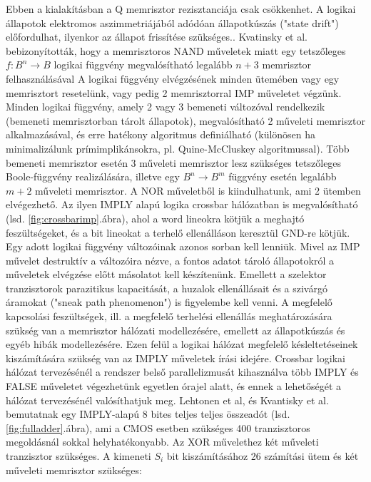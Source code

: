 \documentclass[twoside]{article}
\newcommand\abra[1]{\ref{#1}.ábra}
\begin{document}
Ebben a kialakításban a Q memrisztor rezisztanciája csak csökkenhet. A logikai állapotok elektromos aszimmetriájából adódóan állapotkúszás ("state drift") előfordulhat, ilyenkor az állapot frissítése szükséges.\cite{kvatinsky2011}. Kvatinsky et al. bebizonyították, hogy a memrisztoros NAND műveletek miatt egy tetszőleges $f: B^n \longrightarrow B$ logikai függvény megvalósítható legalább $n+3$ memrisztor felhasználásával\cite{kvatinsky2014} A logikai függvény elvégzésének minden ütemében vagy egy memrisztort resetelünk, vagy pedig 2 memrisztorral IMP műveletet végzünk. Minden logikai függvény, amely 2 vagy 3 bemeneti változóval rendelkezik (bemeneti memrisztorban tárolt állapotok), megvalósítható 2 műveleti memrisztor alkalmazásával\cite{lehtonen2010}, és erre hatékony algoritmus definiálható (különösen ha minimalizálunk prímimplikánsokra, pl. Quine-McCluskey algoritmussal). Több bemeneti memrisztor esetén 3 műveleti memrisztor lesz szükséges tetszőleges Boole-függvény realizálására\cite{lehtonen2009}, illetve egy $B^n \longrightarrow B^m$ függvény esetén legalább $m+2$ műveleti memrisztor. A NOR műveletből is kiindulhatunk, ami 2 ütemben elvégezhető. Az ilyen IMPLY alapú logika crossbar hálózatban is megvalósítható (lsd. \abra{fig:crossbarimp}), ahol a word lineokra kötjük a meghajtó feszültségeket, és a bit lineokat a terhelő ellenálláson keresztül GND-re kötjük.\cite{kvatinsky2014} Egy adott logikai függvény változóinak azonos sorban kell lenniük. Mivel az IMP művelet destruktív a változóira nézve, a fontos adatot tároló állapotokról a műveletek elvégzése előtt másolatot kell készítenünk. Emellett a szelektor tranzisztorok parazitikus kapacitását, a huzalok ellenállásait és a szivárgó áramokat ("sneak path phenomenon") is figyelembe kell venni. A megfelelő kapcsolási feszültségek, ill. a megfelelő terhelési ellenállás meghatározására szükség van a memrisztor hálózati modellezésére, emellett az állapotkúszás és egyéb hibák modellezésére. Ezen felül a logikai hálózat megfelelő késleltetéseinek kiszámítására szükség van az IMPLY műveletek írási idejére. Crossbar logikai hálózat tervezésénél a rendszer belső parallelizmusát kihasználva több IMPLY és FALSE műveletet végezhetünk egyetlen órajel alatt, és ennek a lehetőségét a hálózat tervezésénél valósíthatjuk meg. Lehtonen et al, és Kvantisky et al. bemutatnak egy IMPLY-alapú 8 bites teljes teljes összeadót (lsd. \abra{fig:fulladder}), ami a CMOS esetben szükséges 400 tranzisztoros megoldásnál sokkal helyhatékonyabb. Az XOR művelethez két műveleti tranzisztor szükséges. A kimeneti $S_i$ bit kiszámításához 26 számítási ütem és két műveleti memrisztor szükséges:
\end{document}
